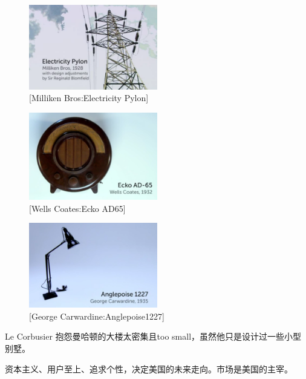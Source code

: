 \documentclass[UTF8]{../RepresentationUniverse}
\begin{document}
\begin{figure}[h]
    \centering
    \includegraphics[width=0.5\textwidth]{./src/figures/Electricity Pylon_2023-04-09_19-18-02.png}
    \caption{[Milliken Bros:Electricity Pylon]}
    \label{figure:Electricity Pylon}
\end{figure}



\begin{figure}[h]
    \centering
    \includegraphics[width=0.5\textwidth]{./src/figures/Ecko AD65_2023-04-09_19-20-05.png}
    \caption{[Wells Coates:Ecko AD65]}
    \label{figure:Ecko AD65}
\end{figure}


\begin{figure}[h]
    \centering
    \includegraphics[width=0.5\textwidth]{./src/figures/Anglepoise1227_2023-04-09_19-21-53.png}
    \caption{[George Carwardine:Anglepoise1227]}
    \label{figure:Anglepoise1227}
\end{figure}


Le Corbusier 抱怨曼哈顿的大楼太密集且too small，虽然他只是设计过一些小型别墅。

资本主义、用户至上、追求个性，决定美国的未来走向。市场是美国的主宰。
\end{document}
